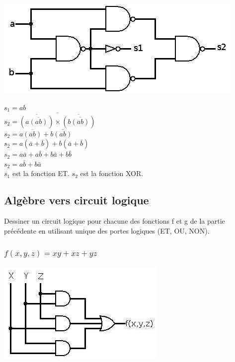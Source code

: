 \documentclass[10pt,a4paper]{article}
\begin{document}
\includegraphics[scale=0.5]{Question6.jpg} 
\begin{flushleft}
$s_{1} = ab$\\
$s_{2} = \overline{\overline{(a\overline{(ab)})} \times \overline{(b\overline{(ab)})}}$\\
$s_{2} = a\overline{(ab)}+b\overline{(ab)}$\\
$s_{2} = a(\bar{a}+\bar{b}) + b(\bar{a}+\bar{b})$\\
$s_{2} = a\bar{a}+a\bar{b}+b\bar{a}+b\bar{b}$\\
$s_{2} = a\bar{b}+b\bar{a}$\\
$s_{1}$ est la fonction ET. $s_{2}$ est la fonction XOR.
\end{flushleft}

\subsection{Algèbre vers circuit logique}
Dessiner un circuit logique pour chacune des fonctions f et g de la partie précédente en utilisant unique des portes logiques (ET, OU, NON).

\subsubsection{$f(x,y,z) = xy+xz+yz$}
\includegraphics[scale=0.5]{Question7f.jpg} 
\end{document}
